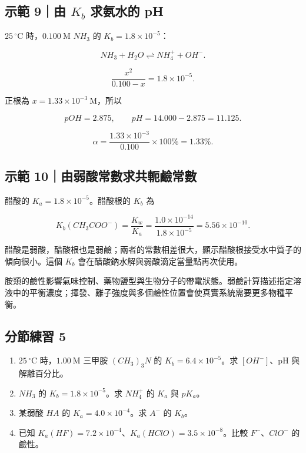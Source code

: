 \documentclass[11pt,a4paper]{article}
\providecommand{\tightlist}{%
  \setlength{\itemsep}{0pt}\setlength{\parskip}{0pt}}
\begin{document}
\begin{HandoutWorkedExample}

\subsection{\texorpdfstring{示範 9｜由 \(K_b\) 求氨水的 pH}{示範 9｜由 K\_b 求氨水的 pH}}\label{ux793aux7bc4-9ux7531-k_b-ux6c42ux6c28ux6c34ux7684-ph}

\(25\,^\circ\mathrm C\) 時，\(0.100\ \mathrm M\) \(NH_3\) 的 \(K_b=1.8\times10^{-5}\)：

\[
NH_3+H_2O\rightleftharpoons NH_4^++OH^-.
\]

\[
\frac{x^2}{0.100-x}=1.8\times10^{-5}.
\]

正根為 \(x=1.33\times10^{-3}\ \mathrm M\)，所以

\[
pOH=2.875,\qquad pH=14.000-2.875=11.125.
\]

\[
\alpha=\frac{1.33\times10^{-3}}{0.100}\times100\%=1.33\%.
\]

\end{HandoutWorkedExample}

\begin{HandoutWorkedExample}

\subsection{示範 10｜由弱酸常數求共軛鹼常數}\label{ux793aux7bc4-10ux7531ux5f31ux9178ux5e38ux6578ux6c42ux5171ux8edbux9e7cux5e38ux6578}

醋酸的 \(K_a=1.8\times10^{-5}\)。醋酸根的 \(K_b\) 為

\[
K_b(CH_3COO^-)=\frac{K_w}{K_a}
=\frac{1.0\times10^{-14}}{1.8\times10^{-5}}
=5.56\times10^{-10}.
\]

醋酸是弱酸，醋酸根也是弱鹼；兩者的常數相差很大，顯示醋酸根接受水中質子的傾向很小。這個 \(K_b\) 會在醋酸鈉水解與弱酸滴定當量點再次使用。

\end{HandoutWorkedExample}

胺類的鹼性影響氣味控制、藥物鹽型與生物分子的帶電狀態。弱鹼計算描述指定溶液中的平衡濃度；揮發、離子強度與多個鹼性位置會使真實系統需要更多物種平衡。

\subsection{分節練習 5}\label{ux5206ux7bc0ux7df4ux7fd2-5}

\begin{enumerate}
\def\labelenumi{\arabic{enumi}.}
\tightlist
\item
  \(25\,^\circ\mathrm C\) 時，\(1.00\ \mathrm M\) 三甲胺 \((CH_3)_3N\) 的 \(K_b=6.4\times10^{-5}\)。求 \([OH^-]\)、pH 與解離百分比。
\item
  \(NH_3\) 的 \(K_b=1.8\times10^{-5}\)。求 \(NH_4^+\) 的 \(K_a\) 與 \(pK_a\)。
\item
  某弱酸 \(HA\) 的 \(K_a=4.0\times10^{-4}\)。求 \(A^-\) 的 \(K_b\)。
\item
  已知 \(K_a(HF)=7.2\times10^{-4}\)、\(K_a(HClO)=3.5\times10^{-8}\)。比較 \(F^-\)、\(ClO^-\) 的鹼性。
\end{enumerate}
\end{document}
